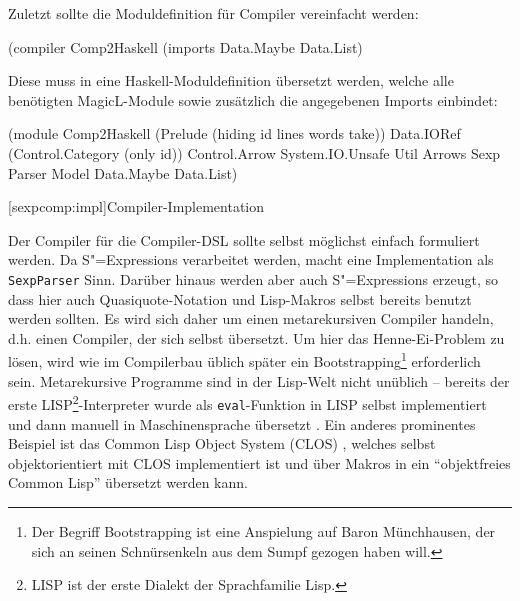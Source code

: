 \documentclass[12pt, a4paper, bibgerm]{scrbook}
\newenvironment{DIFnomarkup}{}{}
\newcommand\icode[1]{\lstinline?#1?}
\newcommand\lsection{}
\newcommand{\sexps}{S"=Expressions}
\begin{document}
Zuletzt sollte die Moduldefinition für Compiler vereinfacht werden:
\begin{DIFnomarkup}\begin{code}
(compiler Comp2Haskell (imports Data.Maybe Data.List)  
\end{code}\end{DIFnomarkup}
Diese muss in eine Haskell-Moduldefinition übersetzt werden, welche alle
benötigten MagicL-Module sowie zusätzlich die angegebenen Imports
einbindet:
\begin{DIFnomarkup}\begin{code}
(module
  Comp2Haskell
  (Prelude (hiding id lines words take))
  Data.IORef
  (Control.Category (only id))
  Control.Arrow
  System.IO.Unsafe
  Util
  Arrows
  Sexp
  Parser
  Model
  Data.Maybe
  Data.List)
\end{code}\end{DIFnomarkup}

\lsection[sexpcomp:impl]{Compiler-Implementation}

Der Compiler für die Compiler-DSL sollte selbst möglichst einfach
formuliert werden. Da \sexps{} verarbeitet werden, macht eine
Implementation als \icode{SexpParser} Sinn. Darüber hinaus werden aber
auch \sexps{} erzeugt, so dass hier auch Quasiquote-Notation und
Lisp-Makros selbst bereits benutzt werden sollten. Es wird sich daher um
einen metarekursiven Compiler handeln, d.h. einen Compiler, der sich
selbst übersetzt. Um hier das Henne-Ei-Problem zu lösen, wird wie im
Compilerbau üblich später ein Bootstrapping\footnote{Der Begriff
  Bootstrapping ist eine Anspielung auf Baron Münchhausen, der sich an
  seinen Schnürsenkeln aus dem Sumpf gezogen haben will.} erforderlich
sein. Metarekursive Programme sind in der Lisp-Welt nicht unüblich --
bereits der erste LISP\footnote{LISP ist der erste Dialekt der
  Sprachfamilie Lisp.}-Interpreter wurde als \icode{eval}-Funktion in
LISP selbst implementiert und dann manuell in Maschinensprache übersetzt
\cite{LispHistory}. Ein anderes prominentes Beispiel ist das Common Lisp
Object System (CLOS) \cite{MetaobjectProtocol}, welches selbst
objektorientiert mit CLOS implementiert ist und über Makros in ein
``objektfreies Common Lisp'' übersetzt werden kann.
\end{document}
